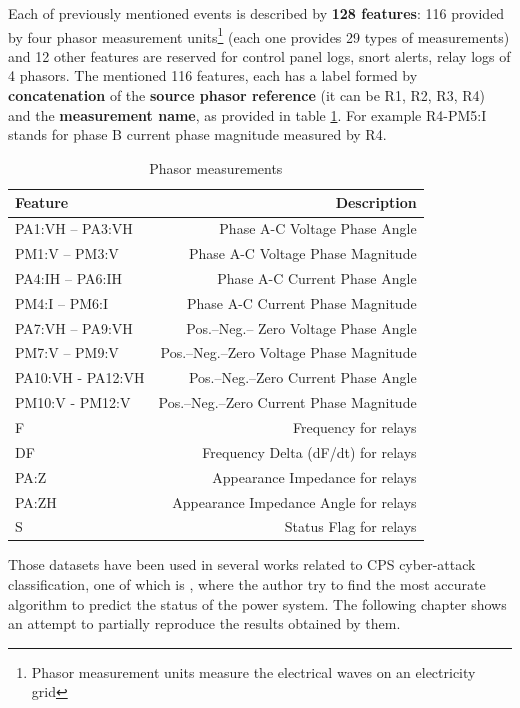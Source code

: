 Each of previously mentioned events is described by \textbf{128 features}: 116 provided by four phasor measurement units\footnote{Phasor measurement units measure the electrical waves on an electricity grid} (each one provides 29 types of measurements) and 12 other features are reserved for control panel logs, snort alerts, relay logs of 4 phasors. The mentioned 116 features, each has a label formed by \textbf{concatenation} of the \textbf{source phasor reference} (it can be R1, R2, R3, R4) and the \textbf{measurement name}, as provided in table \ref{tab:pmu_mes}. For example R4-PM5:I stands for phase B current phase magnitude measured by R4.

\begin{table}[H]
    \centering
    \caption[Phasor measurements]{Phasor measurements \cite{adhikari_power_2014}} \label{tab:pmu_mes}
    \begin{tabular}{lr}
        \toprule
        Feature&Description \\
        \midrule
        PA1:VH – PA3:VH&Phase A-C Voltage Phase Angle \\
        PM1:V – PM3:V&Phase A-C Voltage Phase Magnitude \\
        PA4:IH – PA6:IH&Phase A-C Current Phase Angle \\
        PM4:I – PM6:I&Phase A-C Current Phase Magnitude \\
        PA7:VH – PA9:VH&Pos.–Neg.– Zero Voltage Phase Angle \\
        PM7:V – PM9:V&Pos.–Neg.–Zero Voltage Phase Magnitude \\
        PA10:VH - PA12:VH&Pos.–Neg.–Zero Current Phase Angle \\
        PM10:V - PM12:V&Pos.–Neg.–Zero Current Phase Magnitude \\
        F&Frequency for relays \\
        DF&Frequency Delta (dF/dt) for relays \\
        PA:Z&Appearance Impedance for relays \\
        PA:ZH&Appearance Impedance Angle for relays \\
        S&Status Flag for relays \\
        \bottomrule
    \end{tabular}
\end{table} 

Those datasets have been used in several works related to CPS cyber-attack classification, one of which is \cite{borges_hink_machine_2014-1}, where the author try to find the most accurate algorithm to predict the status of the power system. The following chapter shows an attempt to partially reproduce the results obtained by them.

